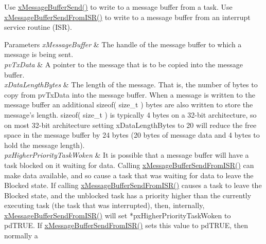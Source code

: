 \begin{DoxyPre}
\begin{DoxyPre}   Use \mbox{\hyperlink{message__buffer_8h_a858f6da6fe24a226c45caf1634ea1605}{xMessageBufferSend()}} to write to a message buffer from a task.  Use
   \mbox{\hyperlink{message__buffer_8h_aeef5b0c4f8c2db6ca2230a8874813e79}{xMessageBufferSendFromISR()}} to write to a message buffer from an interrupt
   service routine (ISR).\end{DoxyPre}
\end{DoxyPre}



\begin{DoxyPre}
\begin{DoxyPre}
\begin{DoxyParams}{Parameters}
{\em xMessageBuffer} & The handle of the message buffer to which a message is
   being sent.\\
\hline
{\em pvTxData} & A pointer to the message that is to be copied into the
   message buffer.\\
\hline
{\em xDataLengthBytes} & The length of the message.  That is, the number of
   bytes to copy from pvTxData into the message buffer.  When a message is
   written to the message buffer an additional sizeof( size\_t ) bytes are also
   written to store the message's length.  sizeof( size\_t ) is typically 4 bytes
   on a 32-bit architecture, so on most 32-bit architecture setting
   xDataLengthBytes to 20 will reduce the free space in the message buffer by 24
   bytes (20 bytes of message data and 4 bytes to hold the message length).\\
\hline
{\em pxHigherPriorityTaskWoken} & It is possible that a message buffer will
   have a task blocked on it waiting for data.  Calling
   \mbox{\hyperlink{message__buffer_8h_aeef5b0c4f8c2db6ca2230a8874813e79}{xMessageBufferSendFromISR()}} can make data available, and so cause a task that
   was waiting for data to leave the Blocked state.  If calling
   \mbox{\hyperlink{message__buffer_8h_aeef5b0c4f8c2db6ca2230a8874813e79}{xMessageBufferSendFromISR()}} causes a task to leave the Blocked state, and the
   unblocked task has a priority higher than the currently executing task (the
   task that was interrupted), then, internally, \mbox{\hyperlink{message__buffer_8h_aeef5b0c4f8c2db6ca2230a8874813e79}{xMessageBufferSendFromISR()}}
   will set *pxHigherPriorityTaskWoken to pdTRUE.  If
   \mbox{\hyperlink{message__buffer_8h_aeef5b0c4f8c2db6ca2230a8874813e79}{xMessageBufferSendFromISR()}} sets this value to pdTRUE, then normally a

\end{DoxyParams}
\end{DoxyPre}
\end{DoxyPre}

